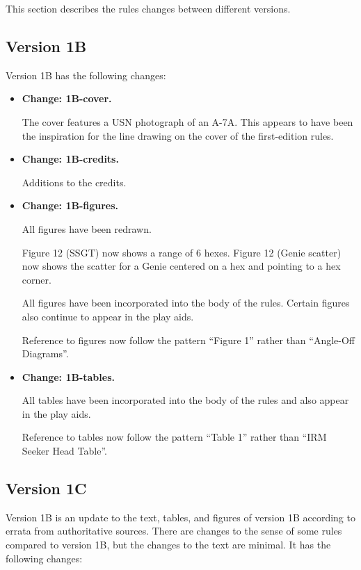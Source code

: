 \documentclass[10pt]{report}
\newcommand{\itemtag}[1]{\item \textbf{Change: #1.}\par}
\begin{document}
This section describes the rules changes between different versions.

\subsection{Version 1B}

Version 1B has the following changes:

\begin{itemize}
    \itemtag{1B-cover} The cover features a USN photograph of an A-7A. This appears to have been the inspiration for the line drawing on the cover of the first-edition {\AirPow} rules.

    \itemtag{1B-credits} Additions to the credits.

    \itemtag{1B-figures} All figures have been redrawn. 
    
    Figure 12 (SSGT) now shows a range of 6 hexes. Figure 12 (Genie scatter) now shows the scatter for a Genie centered on a hex and pointing to a hex corner.
    
    All figures have been incorporated into the body of the rules. Certain figures also continue to appear in the play aids.
    
    Reference to figures now follow the pattern “Figure 1” rather than “Angle-Off Diagrams”.

    \itemtag{1B-tables} All tables have been incorporated into the body of the rules and also appear in the play aids. 
    
    Reference to tables now follow the pattern “Table 1” rather than “IRM Seeker Head Table”.

\end{itemize}

\subsection{Version 1C}

Version 1B is an update to the text, tables, and figures of version 1B according to errata from authoritative sources. There are changes to the sense of some rules compared to version 1B, but the changes to the text are minimal. It has the following changes:
\end{document}
